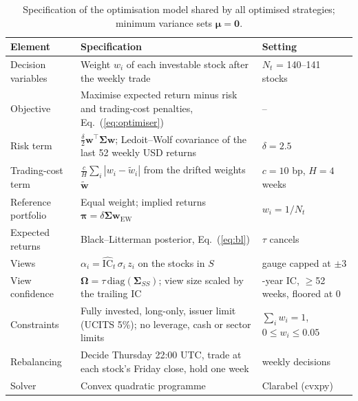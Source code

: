 \begin{table}[H]\centering\footnotesize
\begin{tabularx}{\textwidth}{>{\raggedright\arraybackslash}p{30mm}>{\raggedright\arraybackslash}X>{\raggedright\arraybackslash}p{36mm}}\toprule
Element & Specification & Setting\\\midrule
Decision variables & Weight $w_i$ of each investable stock after the weekly trade & $N_t$ = 140--141 stocks\\
Objective & Maximise expected return minus risk and trading-cost penalties, Eq.~(\ref{eq:optimiser}) & --\\
Risk term & $\frac{\delta}{2}\mathbf w^{\top}\boldsymbol\Sigma\mathbf w$; Ledoit--Wolf covariance of the last 52 weekly USD returns~\cite{ledoitwolf} & $\delta=2.5$\\
Trading-cost term & $\frac{c}{H}\sum_i|w_i-\tilde w_i|$ from the drifted weights $\tilde{\mathbf w}$ & $c=10$ bp, $H=4$ weeks\\
Reference portfolio & Equal weight; implied returns $\boldsymbol\pi=\delta\boldsymbol\Sigma\mathbf w_{\mathrm{EW}}$ & $w_i=1/N_t$\\
Expected returns & Black--Litterman posterior, Eq.~(\ref{eq:bl}) & $\tau$ cancels\\
Views & $\alpha_i=\widehat{\mathrm{IC}}_t\,\sigma_i\,z_i$ on the stocks in $S$ & gauge capped at $\pm3$\\
View confidence & $\boldsymbol\Omega=\tau\,\mathrm{diag}(\boldsymbol\Sigma_{SS})$; view size scaled by the trailing IC & 3-year IC, $\ge$52 weeks, floored at 0\\
Constraints & Fully invested, long-only, issuer limit (UCITS 5\%); no leverage, cash or sector limits & $\sum_i w_i=1$, $0\le w_i\le0.05$\\
Rebalancing & Decide Thursday 22:00 UTC, trade at each stock's Friday close, hold one week & \Weeks{} weekly decisions\\
Solver & Convex quadratic programme & Clarabel (cvxpy)\\\bottomrule
\end{tabularx}
\caption{Specification of the optimisation model shared by all optimised strategies; minimum variance sets $\boldsymbol\mu=\mathbf 0$.}\label{tab:model}
\end{table}
